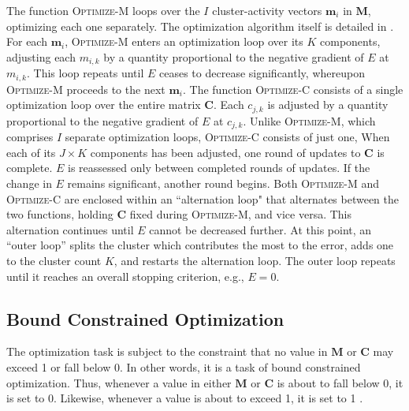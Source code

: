 The function \textsc{Optimize-M} loops over the $I$ cluster-activity vectors $\mathbf{m}_i$ in
$\mathbf{M}$, optimizing each one separately.  The optimization algorithm itself is detailed in \cite{cheng-and-li:2012}.
For each $\mathbf{m}_i$, \textsc{Optimize-M} enters an optimization 
loop over its $K$ components, adjusting each 
$m_{i,k}$ by a
quantity proportional to the negative gradient of $E$ at $m_{i,k}$. 
This loop repeats until $E$
ceases to decrease significantly,
whereupon \textsc{Optimize-M} proceeds to the next $\mathbf{m}_i$.  
The function \textsc{Optimize-C} consists of a single optimization loop over the 
entire matrix
$\mathbf{C}$. Each $c_{j,k}$ is adjusted by a quantity
proportional to the negative gradient of $E$ at $c_{j,k}$.
Unlike \textsc{Optimize-M}, which comprises $I$ separate optimization
loops, \textsc{Optimize-C} consists of just one, 
When each of its $J \times K$
components has been adjusted, one round of updates to $\mathbf{C}$ is
complete.  $E$ is reassessed only between completed rounds of
updates. If the change in $E$ remains significant, another round begins.  
Both \textsc{Optimize-M} and \textsc{Optimize-C} are enclosed within 
an ``alternation loop" 
that alternates between the two functions, holding $\mathbf{C}$ fixed
during \textsc{Optimize-M}, and vice versa.
This alternation continues until $E$ cannot be decreased further. At
this point, an ``outer loop''
splits the cluster which contributes the most to the error, adds one
to the cluster count $K$, and restarts the alternation loop. The outer loop
repeats until it reaches an overall stopping criterion, e.g., $E = 0$.
 \subsection{Bound Constrained Optimization}
The optimization task is subject to the constraint %
that no value in $\mathbf{M}$ or $\mathbf{C}$ may exceed 1 or fall below 0. In other words,
it is a task of bound constrained optimization. Thus, whenever a value in either $\mathbf{M}$ or $\mathbf{C}$ is about
to fall below 0, it is set to 0. Likewise, whenever a value is about to exceed 1, it is set to 1
\citep{ni:yuan:1997}.
  
